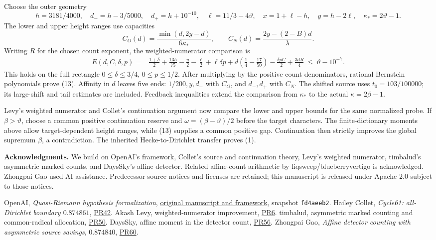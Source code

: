 \documentclass[10pt,a4paper]{article}
\newcommand{\tht}{\vartheta}
\newcommand{\kap}{\kappa}
\begin{document}
Choose the outer geometry
\[
 h=3181/4000,\quad d_-=h-3/5000,\quad d_+=h+10^{-10},\quad
 \ell=11/3-4\tht,\quad x=1+\ell-h,\quad y=h-2\ell,\quad
 \kap_*=2\tht-1.
\]
The lower and upper height ranges use capacities
\[
 C_O(d)=\frac{\min(d,2y-d)}{6\kap_*},\qquad
 C_N(d)=\frac{2y-(2-B)d}{\lambda}.
\]
Writing $R$ for the chosen count exponent, the weighted-numerator comparison is
\begin{align*}
 E(d,C,\delta,p)={}&\frac{1+\delta}{2}+\frac{13h}{75}-\frac y2-\frac\ell2
 +\ell\delta p+d\left(\frac14-\frac{17}{50}\right)
 -\frac{\delta pC}{2}+\frac{3dR}{4}
 \ \le\ \tht-10^{-7}.                                  \tag{13}
\end{align*}
This holds on the full rectangle $0\le\delta\le3/4$, $0\le p\le1/2$.
After multiplying by the positive count denominators, rational Bernstein
polynomials prove (13). Affinity in $d$ leaves five ends:
$1/200,y,d_-$ with $C_O$, and $d_-,d_+$ with $C_N$.
The shifted source uses $t_0=103/100000$; its large-shift and tail estimates
are included. Feedback inequalities extend the comparison from $\kap_*$
to the actual $\kap=2\beta-1$.

Levy's weighted numerator and Collet's continuation argument
\cite{akash,collet} now compare the lower and upper bounds for the same
normalized probe. If $\beta>\tht$, choose a common positive continuation
reserve and $\omega=(\beta-\tht)/2$ before the target characters.
The finite-dictionary moments above allow target-dependent height ranges,
while (13) supplies a common positive gap. Continuation then strictly
improves the global supremum $\beta$, a contradiction. The inherited
Hecke-to-Dirichlet transfer proves (1).

\textbf{Acknowledgments.} We build on OpenAI's framework, Collet's source
and continuation theory, Levy's weighted numerator, timbalud's asymmetric
marked counts, and DaysSky's affine detector. Related affine-count
arithmetic by liqsweep/blueberryvertigo is acknowledged. Zhongpai Gao used
AI assistance. Predecessor source notices and licenses are retained;
this manuscript is released under Apache-2.0 subject to those notices.

\begin{thebibliography}{9}\small
{} OpenAI, \emph{Quasi-Riemann hypothesis formalization},
\href{https://github.com/openai/math/blob/fd4aeeb2ee4fc729c18d98444fed42fd0529eeeb/lean/docs/003.md}{original manuscript and framework}, snapshot \texttt{fd4aeeb2}.
 Hailey Collet, \emph{Cycle61: all-Dirichlet boundary
$0.874861$}, \href{https://github.com/GTimG/QuasiRiemannTracker/pull/42}{PR42}.
 Akash Levy, weighted-numerator improvement,
\href{https://github.com/GTimG/QuasiRiemannTracker/pull/6}{PR6}.
 timbalud, asymmetric marked counting and common-radical
allocation, \href{https://github.com/GTimG/QuasiRiemannTracker/pull/50}{PR50}.
 DaysSky, affine moment in the detector count,
\href{https://github.com/GTimG/QuasiRiemannTracker/pull/56}{PR56}.
 Zhongpai Gao, \emph{Affine detector counting with asymmetric
source savings}, $0.874840$, \href{https://github.com/GTimG/QuasiRiemannTracker/pull/60}{PR60}.
\end{thebibliography}
\end{document}
